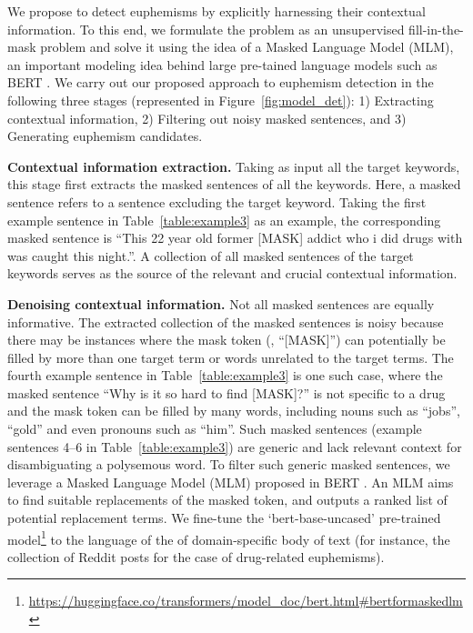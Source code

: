 We propose to detect euphemisms by explicitly harnessing their contextual information. 
To this end, we formulate the problem as an unsupervised fill-in-the-mask problem and solve it using the idea of a Masked Language Model (MLM), an important modeling idea behind large pre-tained language models such as BERT \cite{devlin2019bert}. 
We carry out our proposed approach to euphemism detection in the following three stages (represented  in Figure~\ref{fig:model_det}): 
1) Extracting contextual information, 
2) Filtering out noisy masked sentences, and 
3) Generating euphemism candidates.  

\noindent\textbf{Contextual information extraction.} Taking as input all the target keywords, this stage first extracts the masked sentences of all the keywords. 
Here, a masked sentence refers to a sentence excluding the target keyword. 
Taking the first example sentence in Table~\ref{table:example3} as an example, the corresponding masked sentence is ``This 22 year old former [MASK] addict who i did drugs with was caught this night.''. 
A collection of all  masked sentences of the target keywords serves as the source of the relevant and crucial contextual information. 

\noindent\textbf{Denoising contextual information.} Not all masked sentences are equally informative. 
The extracted collection of the masked sentences is noisy because there may be  instances where the mask token (\ie, ``[MASK]'') can potentially be filled by more than one target term or words unrelated to the target terms. 
The fourth example sentence 
in Table~\ref{table:example3} is one such case, where the masked sentence ``Why is it so hard to find [MASK]?'' is not specific to a drug and the mask token can be filled  by many words, including nouns such as ``jobs'', ``gold'' and even pronouns such as ``him''. 
Such masked sentences (example sentences 4--6 
in Table~\ref{table:example3}) are generic and lack relevant  context for disambiguating a polysemous word. 
To filter such generic masked sentences, we leverage a Masked Language Model (MLM) proposed in BERT \cite{devlin2019bert}. 
An MLM aims to find suitable replacements of the masked token, and outputs a ranked list of potential replacement terms.  We fine-tune the `bert-base-uncased' pre-trained model\footnote{ \url{https://huggingface.co/transformers/model\_doc/bert.html\#bertformaskedlm}} to the language of the  of domain-specific body of text (for instance,  the collection of Reddit posts for the case of drug-related euphemisms).

